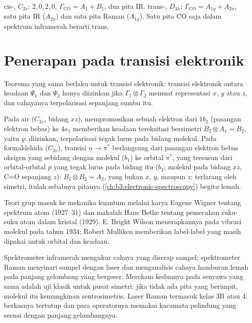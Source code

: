 \begin{example}\label{ex:b3:group-theory-applied:cis-trans}
cis-, $C_{2v}$:  $2, 0, 2, 0$, $\Gamma_{\mathrm{CO}} = A_1 + B_1$,
dua pita IR. trans-, $D_{4h}$: $\Gamma_{\mathrm{CO}} = A_{1g} + A_{2u}$,
satu pita IR ($A_{2u}$) dan satu pita Raman ($A_{1g}$). Satu pita CO saja dalam
spektrum inframerah berarti trans.
\end{example}

\section{Penerapan pada transisi elektronik}

Teorema yang sama berlaku untuk transisi elektronik: transisi elektronik
antara keadaan $\Psi_1$ dan $\Psi_2$ hanya diizinkan jika $\Gamma_1\otimes\Gamma_2$
memuat representasi $x$, $y$ atau $z$, dan cahayanya terpolarisasi sepanjang
sumbu itu.

\begin{example}\label{ex:b3:group-theory-applied:electronic}
Pada air ($C_{2v}$, bidang $xz$), mempromosikan sebuah elektron dari $1b_2$
(pasangan elektron bebas) ke $4a_1$ memberikan keadaan tereksitasi bersimetri
$B_2\otimes A_1 = B_2$, yaitu $y$: diizinkan, terpolarisasi tegak lurus pada
bidang molekul. Pada formaldehida ($C_{2v}$), transisi $n\to\pi^*$ berlangsung
dari pasangan elektron bebas oksigen yang sebidang dengan molekul ($b_1$) ke
orbital $\pi^*$, yang tersusun dari orbital-orbital $p$ yang tegak lurus pada
bidang itu ($b_2$; molekul pada bidang $xz$, C=O sepanjang $z$):
$B_1\otimes B_2 = A_2$, yang bukan $x$, $y$, maupun $z$: terlarang oleh
simetri, itulah sebabnya pitanya (\cref{ch:b3:electronic-spectroscopy}) begitu
lemah.
\end{example}

\begin{history}
Teori grup masuk ke mekanika kuantum melalui karya Eugene Wigner tentang
spektrum atom (1927--31) dan makalah Hans Bethe tentang pemecahan suku-suku
atom dalam kristal (1929). E. Bright Wilson menerapkannya pada vibrasi
molekul pada tahun 1934; Robert Mulliken memberikan label-label yang masih
dipakai untuk orbital dan keadaan.
\end{history}

\begin{inthelab}
Spektrometer inframerah mengukur cahaya yang diserap sampel; spektrometer
Raman menyinari sampel dengan laser dan menganalisis cahaya hamburan lemah
pada panjang gelombang yang bergeser. Merekam keduanya pada senyawa yang sama
adalah uji klasik untuk pusat simetri: jika tidak ada pita yang berimpit,
molekul itu kemungkinan sentrosimetris. Laser Raman termasuk kelas 3B atau 4:
berkasnya tertutup dan para operatornya memakai kacamata pelindung yang
sesuai dengan panjang gelombangnya.
\end{inthelab}

